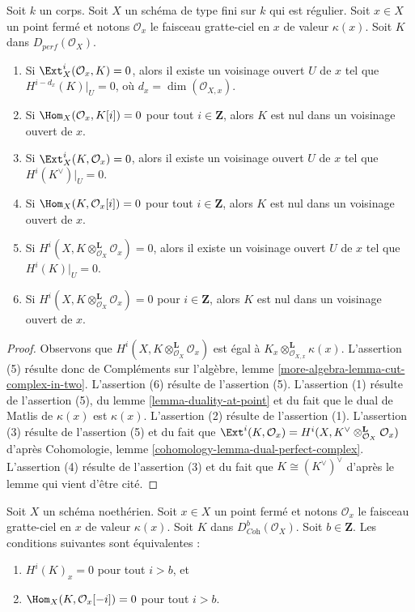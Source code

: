 \begin{lemma}
\label{lemma-orthogonal-point-sheaf}
Soit $k$ un corps. Soit $X$ un schéma de type fini sur $k$ qui
est régulier. Soit $x \in X$ un point fermé et notons $\mathcal{O}_x$
le faisceau gratte-ciel en $x$ de valeur $\kappa(x)$. Soit $K$ dans
$D_{perf}(\mathcal{O}_X)$.
\begin{enumerate}
\item Si $\Ext^i_X(\mathcal{O}_x, K) = 0$, alors il existe un voisinage
ouvert $U$ de $x$ tel que $H^{i - d_x}(K)|_U = 0$, où
$d_x = \dim(\mathcal{O}_{X, x})$.
\item Si $\Hom_X(\mathcal{O}_x, K[i]) = 0$ pour tout
$i \in \mathbf{Z}$, alors $K$ est nul dans un voisinage ouvert de $x$.
\item Si $\Ext^i_X(K, \mathcal{O}_x) = 0$, alors il existe un voisinage
ouvert $U$ de $x$ tel que $H^i(K^\vee)|_U = 0$.
\item Si $\Hom_X(K, \mathcal{O}_x[i]) = 0$ pour tout
$i \in \mathbf{Z}$, alors $K$ est nul dans un voisinage ouvert de $x$.
\item Si $H^i(X, K \otimes_{\mathcal{O}_X}^\mathbf{L} \mathcal{O}_x) = 0$,
alors il existe un voisinage ouvert $U$ de $x$ tel que
$H^i(K)|_U = 0$.
\item Si $H^i(X, K \otimes_{\mathcal{O}_X}^\mathbf{L} \mathcal{O}_x) = 0$
pour $i \in \mathbf{Z}$, alors $K$ est nul dans un
voisinage ouvert de $x$.
\end{enumerate}
\end{lemma}

\begin{proof}
Observons que $H^i(X, K \otimes_{\mathcal{O}_X}^\mathbf{L} \mathcal{O}_x)$
est égal à $K_x  \otimes_{\mathcal{O}_{X, x}}^\mathbf{L} \kappa(x)$.
L'assertion (5) résulte donc de Compléments sur l'algèbre, lemme
\ref{more-algebra-lemma-cut-complex-in-two}.
L'assertion (6) résulte de l'assertion (5).
L'assertion (1) résulte de l'assertion (5), du lemme \ref{lemma-duality-at-point} et du
fait que le dual de Matlis de $\kappa(x)$ est $\kappa(x)$.
L'assertion (2) résulte de l'assertion (1).
L'assertion (3) résulte de l'assertion (5) et du fait que
$\Ext^i(K, \mathcal{O}_x) =
H^i(X, K^\vee \otimes_{\mathcal{O}_X}^\mathbf{L} \mathcal{O}_x)$ d'après
Cohomologie, lemme \ref{cohomology-lemma-dual-perfect-complex}.
L'assertion (4) résulte de l'assertion (3) et du fait que $K \cong (K^\vee)^\vee$
d'après le lemme qui vient d'être cité.
\end{proof}

\begin{lemma}
\label{lemma-hom-into-point-sheaf}
Soit $X$ un schéma noethérien. Soit $x \in X$ un point fermé et
notons $\mathcal{O}_x$ le faisceau gratte-ciel en $x$ de valeur $\kappa(x)$.
Soit $K$ dans $D^b_{\textit{Coh}}(\mathcal{O}_X)$. Soit $b \in \mathbf{Z}$.
Les conditions suivantes sont équivalentes :
\begin{enumerate}
\item $H^i(K)_x = 0$ pour tout $i > b$, et
\item $\Hom_X(K, \mathcal{O}_x[-i]) = 0$ pour tout $i > b$.
\end{enumerate}
\end{lemma}

